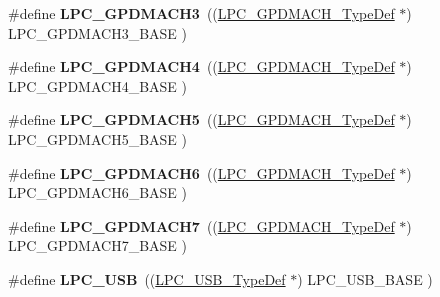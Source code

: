 \begin{DoxyCompactItemize}
\item 
\hypertarget{group___l_p_c17xx___system_gaa4f54bce7705a81c84a357cbfc4757ed}{\#define {\bfseries \-L\-P\-C\-\_\-\-G\-P\-D\-M\-A\-C\-H3}~((\hyperlink{struct_l_p_c___g_p_d_m_a_c_h___type_def}{\-L\-P\-C\-\_\-\-G\-P\-D\-M\-A\-C\-H\-\_\-\-Type\-Def}   $\ast$) \-L\-P\-C\-\_\-\-G\-P\-D\-M\-A\-C\-H3\-\_\-\-B\-A\-S\-E )}\label{group___l_p_c17xx___system_gaa4f54bce7705a81c84a357cbfc4757ed}

\item 
\hypertarget{group___l_p_c17xx___system_ga8571e9cf7175bae6faf7963a271f48d4}{\#define {\bfseries \-L\-P\-C\-\_\-\-G\-P\-D\-M\-A\-C\-H4}~((\hyperlink{struct_l_p_c___g_p_d_m_a_c_h___type_def}{\-L\-P\-C\-\_\-\-G\-P\-D\-M\-A\-C\-H\-\_\-\-Type\-Def}   $\ast$) \-L\-P\-C\-\_\-\-G\-P\-D\-M\-A\-C\-H4\-\_\-\-B\-A\-S\-E )}\label{group___l_p_c17xx___system_ga8571e9cf7175bae6faf7963a271f48d4}

\item 
\hypertarget{group___l_p_c17xx___system_ga3037ac33f3f1cbfaa0623bd73085bd37}{\#define {\bfseries \-L\-P\-C\-\_\-\-G\-P\-D\-M\-A\-C\-H5}~((\hyperlink{struct_l_p_c___g_p_d_m_a_c_h___type_def}{\-L\-P\-C\-\_\-\-G\-P\-D\-M\-A\-C\-H\-\_\-\-Type\-Def}   $\ast$) \-L\-P\-C\-\_\-\-G\-P\-D\-M\-A\-C\-H5\-\_\-\-B\-A\-S\-E )}\label{group___l_p_c17xx___system_ga3037ac33f3f1cbfaa0623bd73085bd37}

\item 
\hypertarget{group___l_p_c17xx___system_gafe18efb195eb0e8bf265b97bb4520848}{\#define {\bfseries \-L\-P\-C\-\_\-\-G\-P\-D\-M\-A\-C\-H6}~((\hyperlink{struct_l_p_c___g_p_d_m_a_c_h___type_def}{\-L\-P\-C\-\_\-\-G\-P\-D\-M\-A\-C\-H\-\_\-\-Type\-Def}   $\ast$) \-L\-P\-C\-\_\-\-G\-P\-D\-M\-A\-C\-H6\-\_\-\-B\-A\-S\-E )}\label{group___l_p_c17xx___system_gafe18efb195eb0e8bf265b97bb4520848}

\item 
\hypertarget{group___l_p_c17xx___system_ga53536fc136007bcb4dd9e9a0257bf4fa}{\#define {\bfseries \-L\-P\-C\-\_\-\-G\-P\-D\-M\-A\-C\-H7}~((\hyperlink{struct_l_p_c___g_p_d_m_a_c_h___type_def}{\-L\-P\-C\-\_\-\-G\-P\-D\-M\-A\-C\-H\-\_\-\-Type\-Def}   $\ast$) \-L\-P\-C\-\_\-\-G\-P\-D\-M\-A\-C\-H7\-\_\-\-B\-A\-S\-E )}\label{group___l_p_c17xx___system_ga53536fc136007bcb4dd9e9a0257bf4fa}

\item 
\hypertarget{group___l_p_c17xx___system_gae77538a7f3f4850715c95283e38b423f}{\#define {\bfseries \-L\-P\-C\-\_\-\-U\-S\-B}~((\hyperlink{struct_l_p_c___u_s_b___type_def}{\-L\-P\-C\-\_\-\-U\-S\-B\-\_\-\-Type\-Def}       $\ast$) \-L\-P\-C\-\_\-\-U\-S\-B\-\_\-\-B\-A\-S\-E      )}\label{group___l_p_c17xx___system_gae77538a7f3f4850715c95283e38b423f}

\end{DoxyCompactItemize}
